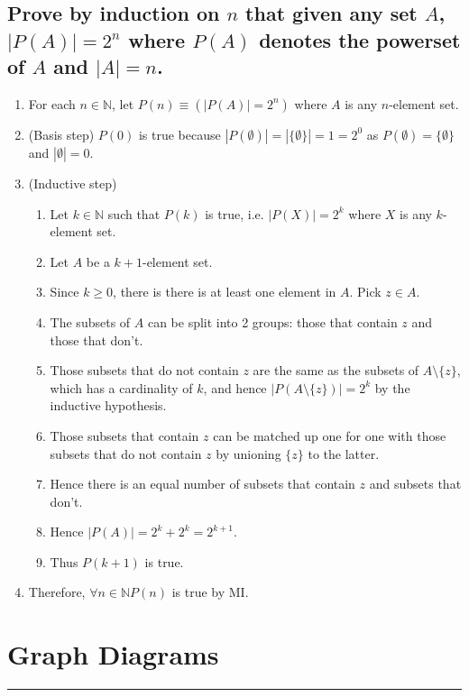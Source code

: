 \documentclass{article}
\begin{document}
\subsection*{Prove by induction on $n$ that given any set $A$, $|P(A)|=2^{n}$ where $P(A)$ denotes the powerset of $A$ and $|A|=n$.}
\begin{enumerate}
	\item For each $n\in\mathbb{N}$, let $P(n)\equiv (|P(A)|=2^{n})$ where $A$ is any $n$-element set.
	\item (Basis step) $P(0)$ is true because $|P(\emptyset)|=|\{\emptyset\}|=1=2^{0}$ as $P(\emptyset)=\{\emptyset\}$ and $|\emptyset|=0$.
	\item (Inductive step)
	\begin{enumerate}
		\item Let $k\in\mathbb{N}$ such that $P(k)$ is true, i.e. $|P(X)|=2^{k}$ where $X$ is any $k$-element set.
		\item Let $A$ be a $k+1$-element set.
		\item Since $k\geq 0$, there is there is at least one element in $A$. Pick $z\in A$.
		\item The subsets of $A$ can be split into 2 groups: those that contain $z$ and those that don’t.
		\item Those subsets that do not contain $z$ are the same as the subsets of $A\setminus \{z\}$, which has a cardinality of $k$, and hence $|P(A\setminus \{z\})|=2^{k}$ by the inductive hypothesis.
		\item Those subsets that contain $z$ can be matched up one for one with those subsets that do not contain $z$ by unioning $\{z\}$ to the latter.
		\item Hence there is an equal number of subsets that contain $z$ and subsets that don’t.
		\item Hence $|P(A)|=2^{k}+2^{k}=2^{k+1}$.
		\item Thus $P(k+1)$ is true.
	\end{enumerate}
	\item Therefore, $\forall n\in\mathbb{N} P(n)$ is true by MI.
\end{enumerate}

\endgroup


\newpage
\section*{Graph Diagrams}
\hrule
\vspace{0.5cm}
\end{document}

